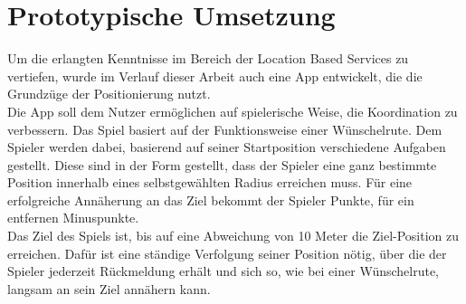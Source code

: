 \newpage
\section{Prototypische Umsetzung}
Um die erlangten Kenntnisse im Bereich der Location Based Services zu vertiefen, wurde im Verlauf dieser Arbeit auch eine App entwickelt, die die Grundzüge der Positionierung nutzt. 
\\
Die App soll dem Nutzer ermöglichen auf spielerische Weise, die Koordination zu verbessern. Das Spiel basiert auf der Funktionsweise einer Wünschelrute. Dem Spieler werden dabei, basierend auf seiner Startposition verschiedene Aufgaben gestellt. Diese sind in der Form gestellt, dass der Spieler eine ganz bestimmte Position innerhalb eines selbstgewählten Radius erreichen muss. Für eine erfolgreiche Annäherung an das Ziel bekommt der Spieler Punkte, für ein entfernen Minuspunkte.
\\
Das Ziel des Spiels ist, bis auf eine Abweichung von 10 Meter die Ziel-Position zu erreichen. Dafür ist eine ständige Verfolgung seiner Position nötig, über die der Spieler jederzeit Rückmeldung erhält und sich so, wie bei einer Wünschelrute, langsam an sein Ziel annähern kann.









